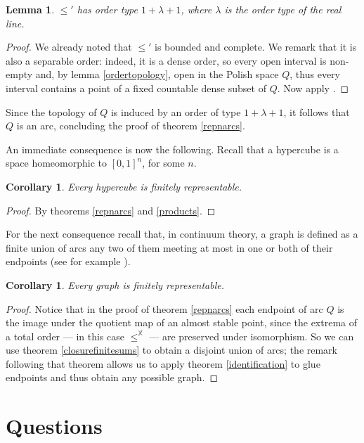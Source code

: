\documentclass[12pt,twoside,a4paper]{amsart}
\theoremstyle{plain}
\newtheorem{lemma}[theorem]{Lemma}
\newtheorem{corollary}[theorem]{Corollary}
\theoremstyle{definition}
\begin{document}
\begin{lemma}
$\leq'$ has order type $1+\lambda +1$, where $\lambda $ is the order type of the real line.
\end{lemma}

\begin{proof}
We already noted that $\leq'$ is bounded and complete.
We remark that it is also a separable order: indeed, it is a dense order, so every open interval is non-empty and, by lemma \ref{ordertopology}, open in the Polish space $Q$, thus every interval contains a point of a fixed countable dense subset of $Q$.
Now apply \cite[theorem 2.30]{Rosens1982}.
\end{proof}

Since the topology of $Q$ is induced by an order of type $1+\lambda +1$, it follows that $Q$ is an arc, concluding the proof of theorem \ref{repnarcs}.

An immediate consequence is now the following.
Recall that a hypercube is a space homeomorphic to $[0,1]^n$, for some $n$.

\begin{corollary}
Every hypercube is finitely representable.
\end{corollary}

\begin{proof}
By theorems \ref{repnarcs} and \ref{products}.
\end{proof}

For the next consequence recall that, in continuum theory, a graph is defined as a finite union of arcs any two of them meeting at most in one or both of their endpoints (see for example \cite{Nadler1992}).

\begin{corollary}
Every graph is finitely representable.
\end{corollary}

\begin{proof}
Notice that in the proof of theorem \ref{repnarcs} each endpoint of arc $Q$ is the image under the quotient map of an almost stable point, since the extrema of a total order --- in this case $ \leq^{ \mathbb X }$ --- are preserved under isomorphism.
So we can use theorem \ref{closurefinitesums} to obtain a disjoint union of arcs; the remark following that theorem allows us to apply theorem \ref{identification} to glue endpoints and thus obtain any possible graph.
\end{proof}

\section{Questions} \label{qs}
\end{document}
